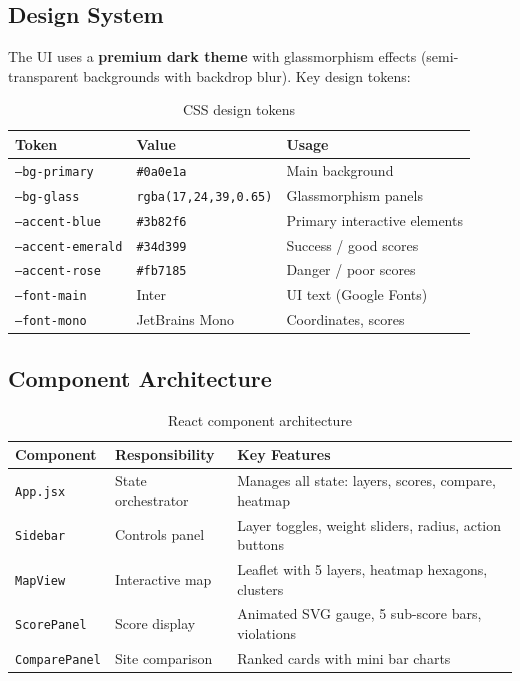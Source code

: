 \documentclass[12pt, a4paper]{article}
\begin{document}
\subsection{Design System}

The UI uses a \textbf{premium dark theme} with glassmorphism effects (semi-transparent
backgrounds with backdrop blur). Key design tokens:

\begin{table}[H]
\centering
\begin{tabularx}{\textwidth}{l l X}
    \toprule
    \textbf{Token} & \textbf{Value} & \textbf{Usage} \\
    \midrule
    \texttt{--bg-primary}    & \texttt{\#0a0e1a}            & Main background \\
    \texttt{--bg-glass}      & \texttt{rgba(17,24,39,0.65)} & Glassmorphism panels \\
    \texttt{--accent-blue}   & \texttt{\#3b82f6}            & Primary interactive elements \\
    \texttt{--accent-emerald} & \texttt{\#34d399}           & Success / good scores \\
    \texttt{--accent-rose}   & \texttt{\#fb7185}            & Danger / poor scores \\
    \texttt{--font-main}     & Inter                        & UI text (Google Fonts) \\
    \texttt{--font-mono}     & JetBrains Mono               & Coordinates, scores \\
    \bottomrule
\end{tabularx}
\caption{CSS design tokens}
\end{table}

\subsection{Component Architecture}

\begin{table}[H]
\centering
\begin{tabularx}{\textwidth}{l l X}
    \toprule
    \textbf{Component} & \textbf{Responsibility} & \textbf{Key Features} \\
    \midrule
    \texttt{App.jsx}        & State orchestrator & Manages all state: layers, scores, compare, heatmap \\
    \texttt{Sidebar}        & Controls panel     & Layer toggles, weight sliders, radius, action buttons \\
    \texttt{MapView}        & Interactive map    & Leaflet with 5 layers, heatmap hexagons, clusters \\
    \texttt{ScorePanel}     & Score display      & Animated SVG gauge, 5 sub-score bars, violations \\
    \texttt{ComparePanel}   & Site comparison    & Ranked cards with mini bar charts \\
    \bottomrule
\end{tabularx}
\caption{React component architecture}
\end{table}
\end{document}
